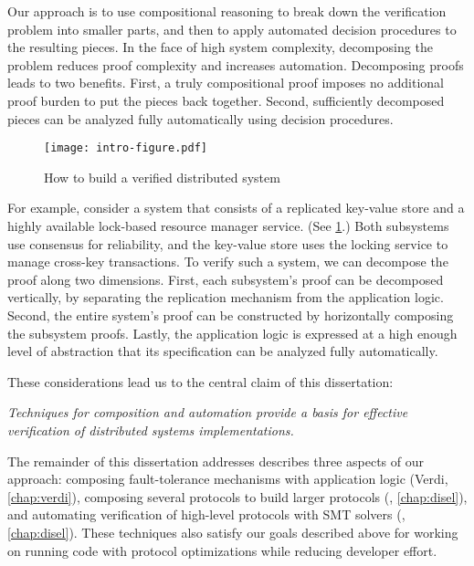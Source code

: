 Our approach is to use compositional reasoning to break down
  the verification problem into smaller parts,
  and then to apply automated decision procedures to the resulting pieces.
In the face of high system complexity,
  decomposing the problem reduces proof complexity and increases automation.
Decomposing proofs leads to two benefits.
First, a truly compositional proof
  imposes no additional proof burden
  to put the pieces back together.
Second, sufficiently decomposed pieces can
  be analyzed fully automatically using decision procedures.

\begin{figure}[t]
  \centering
  \texttt{[image: intro-figure.pdf]}
  \caption{How to build a verified distributed system}
  \label{fig:intro}
\end{figure}

For example, consider a system that consists of
  a replicated key-value store
  and a highly available lock-based resource manager service.
(See \cref{fig:intro}.)
Both subsystems use consensus for reliability,
  and the key-value store uses the locking service to manage cross-key transactions.
To verify such a system, we can decompose the proof along two dimensions.
First, each subsystem's proof can be decomposed vertically,
  by separating the replication mechanism from the application logic.
Second, the entire system's proof can be constructed
  by horizontally composing the subsystem proofs.
Lastly, the application logic is expressed at a high enough level of abstraction
  that its specification can be analyzed fully automatically.

These considerations lead us to the central claim of this dissertation:
\begin{center}
\emph{Techniques for composition and automation provide a basis for
  effective verification of distributed systems implementations.
}
\end{center}

The remainder of this dissertation addresses describes three aspects of our approach:
  composing fault-tolerance mechanisms with application logic (Verdi, \cref{chap:verdi}),
  composing several protocols to build larger protocols (\disel, \cref{chap:disel}), and
  automating verification of high-level protocols with SMT solvers (\mypyvy, \cref{chap:disel}).
These techniques also satisfy our goals described above for working on
  running code with protocol optimizations while reducing developer effort.

